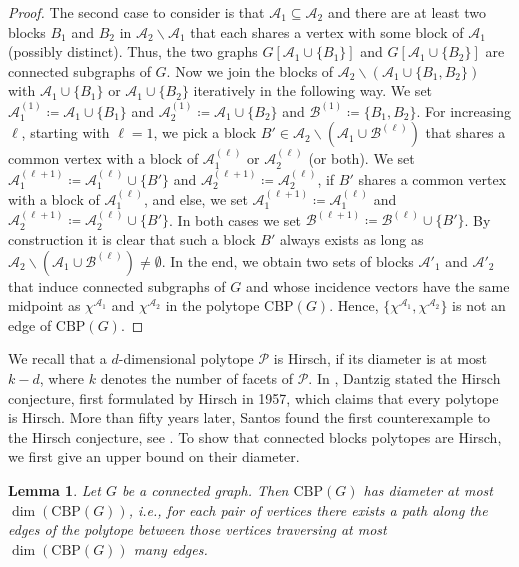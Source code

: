 \documentclass[12pt]{amsart}
\newtheorem{lemma}[theorem]{Lemma}
\newcommand{\CBP}{\mathrm{CBP}}
\renewcommand{\P}{\mathcal{P}}
\newcommand{\B}{\mathcal{B}}
\newcommand{\A}{\mathcal{A}}
\begin{document}
\begin{proof}
    The second case to consider is that $\A_1 \subseteq \A_2$ and there are at least two blocks $B_1$ and $B_2$ in $\A_2 \backslash \A_1$ that each shares a vertex with some block of $\A_1$ (possibly distinct). Thus, the two graphs $G[\A_1 \cup \{B_1\}]$ and $G[\A_1 \cup \{B_2\}]$ are connected subgraphs of $G$. Now we join the blocks of $\A_2 \backslash (\A_1 \cup \{B_1,B_2\})$ with $\A_1 \cup \{B_1\}$ or $\A_1 \cup \{B_2\}$ iteratively in the following way. We set $\A_1^{(1)}\coloneqq \A_1  \cup \{B_1\}$ and $\A_2^{(1)}\coloneqq \A_1 \cup \{B_2\}$ and $\B^{(1)}\coloneqq \{B_1,B_2\}$. For increasing $\ell$, starting with $\ell=1$, we pick a block $B' \in \A_2 \backslash (\A_1 \cup \B^{(\ell)})$ that shares a common vertex with a block of $\A_1^{(\ell)}$ or $\A_2^{(\ell)}$ (or both). We set $\A_1^{(\ell+1)}\coloneqq \A_1^{(\ell)} \cup \{B'\}$ and $\A_2^{(\ell+1)}\coloneqq \A_2^{(\ell)}$, if $B'$ shares a common vertex with a block of $\A_1^{(\ell)}$, and else, we set $\A_1^{(\ell+1)}\coloneqq \A_1^{(\ell)}$ and $\A_2^{(\ell+1)}\coloneqq \A_2^{(\ell)}\cup \{B'\}$. In both cases we set $\B^{(\ell+1)}\coloneqq \B^{(\ell)}\cup \{B'\}$. By construction it is clear that such a block $B'$ always exists as long as $\A_2 \backslash (\A_1 \cup \B^{(\ell)}) \neq \emptyset$. In the end, we obtain two sets of blocks $\A'_1$ and $\A'_2$ that induce connected subgraphs of $G$ and whose incidence vectors have the same midpoint as $\chi^{\A_1}$ and $\chi^{\A_2}$ in the polytope $\CBP(G)$. Hence, $\{\chi^{\A_1}, \chi^{\A_2}\}$ is not an edge of $\CBP(G)$.
\end{proof}

We recall that a $d$-dimensional polytope $\P$ is Hirsch, if its diameter is at most $k-d$, where $k$ denotes the number of facets of $\P$. In \cite{Dantzig}, Dantzig stated the Hirsch conjecture, first formulated by Hirsch in 1957, which claims that every polytope is Hirsch. More than fifty years later, Santos found the first counterexample to the Hirsch conjecture, see \cite{Santos_2012}. To show that connected blocks polytopes are Hirsch, we first give an upper bound on their diameter.

\begin{lemma}
    \label{diameter}
    Let $G$ be a connected graph. Then $\CBP(G)$ has diameter at most $\dim(\CBP(G))$, i.e., for each pair of vertices there exists a path along the edges of the polytope between those vertices traversing at most $\dim(\CBP(G))$ many edges.
\end{lemma}
\end{document}
